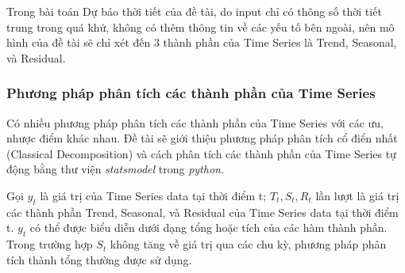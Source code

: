 \documentclass[12pt]{article}
\begin{document}
        Trong bài toán Dự báo thời tiết của đề tài, do input chỉ có thông số thời tiết trung trong quá khứ, không có thêm thông tin về các yếu tố bên ngoài, nên mô hình của đề tài sẽ chỉ xét đến 3 thành phần của Time Series là Trend, Seasonal, và Residual.
        
        \subsubsection{Phương pháp phân tích các thành phần của Time Series}
        Có nhiều phương pháp phân tích các thành phần của Time Series với các ưu, nhược điểm khác nhau. Đề tài sẽ giới thiệu phương pháp phân tích cổ điển nhất (Classical Decomposition) và cách phân tích các thành phần của Time Series tự động bằng thư viện \textit{statsmodel} trong \textit{python}.
        
        Gọi $y_t$ là giá trị của Time Series data tại thời điểm t; $T_t, S_t, R_t$ lần lượt là giá trị các thành phần Trend, Seasonal, và Residual của Time Series data tại thời điểm t. $y_t$ có thể được biểu diễn dưới dạng tổng hoặc tích của các hàm thành phần. Trong trường hợp $S_t$ không tăng về giá trị qua các chu kỳ, phương pháp phân tích thành tổng thường được sử dụng.
        
\end{document}
